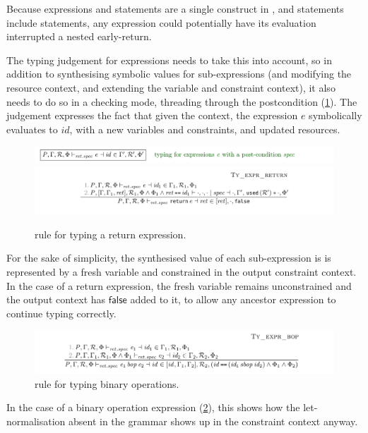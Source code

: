 Because expressions and statements are a single construct in , and
statements include  statements, any expression could
potentially have its evaluation interrupted a nested early-return.

The typing judgement for expressions needs to take this into account, so in
addition to synthesising symbolic values for sub-expressions (and modifying the
resource context, and extending the variable and constraint context), it also
needs to do so in a checking mode, threading through the postcondition
(\cref{fig:minicn-return}). The judgement expresses the fact that given the
context, the expression $\mathit{e}$ symbolically evaluates to $\mathit{id}$,
with a new variables and constraints, and updated resources.

\begin{figure}[tpb]
    \ContinuedFloat*
    \includegraphics{figures/minicn-expr-judgement}
    \includegraphics{figures/minicn-return}
    \caption{ rule for typing a return expression.}\label{fig:minicn-return}
\end{figure}

For the sake of simplicity, the synthesised value of each sub-expression is is
represented by a fresh variable and constrained in the output constraint
context. In the case of a return expression, the fresh variable remains
unconstrained and the output context has $\mathsf{false}$ added to it, to allow
any ancestor expression to continue typing correctly.

\begin{figure}[tpb]
    \ContinuedFloat{}
    \includegraphics{figures/minicn-bop}
    \caption{ rule for typing binary operations.}\label{fig:minicn-bop}
\end{figure}

In the case of a binary operation expression (\cref{fig:minicn-bop}), this
shows how the let-normalisation absent in the grammar shows up in the
constraint context anyway.

